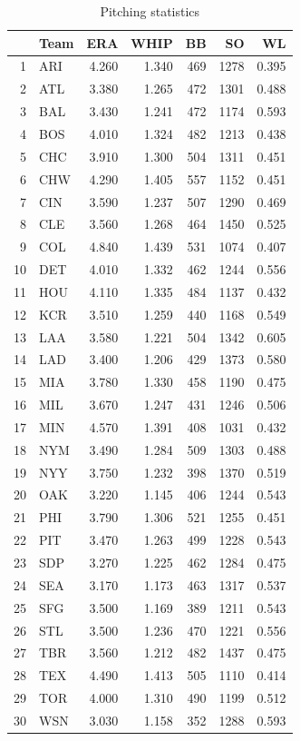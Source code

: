 \documentclass[landscape]{article}
\begin{document}
  \begin{table}[H]
    \centering
    \begin{tabular}{rlrrrrr}
      \toprule
          & Team & ERA   & WHIP  & BB  & SO   & WL \\
      \midrule
      1   & ARI  & 4.260 & 1.340 & 469 & 1278 & 0.395 \\
      2   & ATL  & 3.380 & 1.265 & 472 & 1301 & 0.488 \\
      3   & BAL  & 3.430 & 1.241 & 472 & 1174 & 0.593 \\
      4   & BOS  & 4.010 & 1.324 & 482 & 1213 & 0.438 \\
      5   & CHC  & 3.910 & 1.300 & 504 & 1311 & 0.451 \\
      6   & CHW  & 4.290 & 1.405 & 557 & 1152 & 0.451 \\
      7   & CIN  & 3.590 & 1.237 & 507 & 1290 & 0.469 \\
      8   & CLE  & 3.560 & 1.268 & 464 & 1450 & 0.525 \\
      9   & COL  & 4.840 & 1.439 & 531 & 1074 & 0.407 \\
      10  & DET  & 4.010 & 1.332 & 462 & 1244 & 0.556 \\
      11  & HOU  & 4.110 & 1.335 & 484 & 1137 & 0.432 \\
      12  & KCR  & 3.510 & 1.259 & 440 & 1168 & 0.549 \\
      13  & LAA  & 3.580 & 1.221 & 504 & 1342 & 0.605 \\
      14  & LAD  & 3.400 & 1.206 & 429 & 1373 & 0.580 \\
      15  & MIA  & 3.780 & 1.330 & 458 & 1190 & 0.475 \\
      16  & MIL  & 3.670 & 1.247 & 431 & 1246 & 0.506 \\
      17  & MIN  & 4.570 & 1.391 & 408 & 1031 & 0.432 \\
      18  & NYM  & 3.490 & 1.284 & 509 & 1303 & 0.488 \\
      19  & NYY  & 3.750 & 1.232 & 398 & 1370 & 0.519 \\
      20  & OAK  & 3.220 & 1.145 & 406 & 1244 & 0.543 \\
      21  & PHI  & 3.790 & 1.306 & 521 & 1255 & 0.451 \\
      22  & PIT  & 3.470 & 1.263 & 499 & 1228 & 0.543 \\
      23  & SDP  & 3.270 & 1.225 & 462 & 1284 & 0.475 \\
      24  & SEA  & 3.170 & 1.173 & 463 & 1317 & 0.537 \\
      25  & SFG  & 3.500 & 1.169 & 389 & 1211 & 0.543 \\
      26  & STL  & 3.500 & 1.236 & 470 & 1221 & 0.556 \\
      27  & TBR  & 3.560 & 1.212 & 482 & 1437 & 0.475 \\
      28  & TEX  & 4.490 & 1.413 & 505 & 1110 & 0.414 \\
      29  & TOR  & 4.000 & 1.310 & 490 & 1199 & 0.512 \\
      30  & WSN  & 3.030 & 1.158 & 352 & 1288 & 0.593 \\
      \bottomrule
    \end{tabular}
    \caption{Pitching statistics}
  \end{table}
\end{document}
